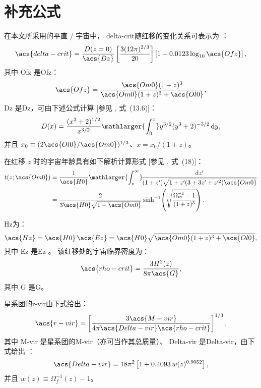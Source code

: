 
\chapter{补充公式}
\label{chap:formulas}


在本文所采用的平直 \lcdm/ 宇宙中，
\ac{delta-crit}随红移的变化关系可表示为 \cite{kitayama1996,randall2002}：
\begin{equation}
  \label{eq:delta-crit}
  \acs{delta-crit} = \frac{D(z=0)}{\acs{Dz}}
    \left[ \frac{3 (12\pi)^{2/3}}{20} \right]
    \left[1 + 0.0123 \log_{10} \acs{Ofz} \right] ,
\end{equation}
其中 \acs{Ofz} 是\acl{Ofz}：
\begin{equation}
  \label{eq:omega-fz}
  \acs{Ofz} = \frac{\acs{Om0} (1+z)^3}{\acs{Om0} (1+z)^3 + \acs{Ol0}} ,
\end{equation}
\acs{Dz} 是\acl{Dz}，可由下述公式计算
[参见 \textcite{peebles1980}, 式~(13.6)]：
\begin{equation}
  \label{eq:growth-factor}
  D(x) = \frac{(x^3 + 2)^{1/2}}{x^{3/2}}
    \mathlarger{\int_0^x} y^{3/2} (y^3 + 2)^{-3/2} \,\D{y} ,
\end{equation}
并且 $x_0 \equiv (2 \acs{Ol0}/\acs{Om0})^{1/3}$、$x = x_0 / (1+z)$。

在红移 $z$ 时的宇宙年龄具有如下解析计算形式
[参见 \textcite{thomas2000}, 式~(18)]：
\begin{align}
  \label{eq:universe-age}
  t(z; \acs{Om0})
    & = \frac{1}{\acs{H0}} \mathlarger{\int_z^{\infty}}
      \!\frac{\D{z'}}{(1+z')\sqrt{1 + z' (3+3z'+z'^2) \acs{Om0}}}
      \nonumber \\
    & = \frac{2}{3 \acs{H0} \sqrt{1-\acs{Om0}}} \sinh^{-1}
      \!\left( \sqrt{\frac{\Omega_m^{-1} - 1}{(1+z)^3}} \right).
\end{align}

\acl{Hz}为：
\begin{equation}
  \label{eq:hubble-z}
  \acs{Hz} = \acs{H0} \, \acs{Ez}
    = \acs{H0} \sqrt{\acs{Om0} (1+z)^3 + \acs{Ol0}} ,
\end{equation}
其中 \acs{Ez} 是\acl{Ez} \cite{hogg1999}。
该红移处的宇宙临界密度为：
\begin{equation}
  \label{eq:rho-crit}
  \acs{rho-crit} = \frac{3 H^2(z)}{8 \pi \acs{G}} ,
\end{equation}
其中 \acs{G} 是\acl{G}。

星系团的\acf{r-vir}由下式给出：
\begin{equation}
  \label{eq:radius-virial}
  \acs{r-vir} = \left[
    \frac{3 \acs{M-vir}}{4\pi \acs{Delta-vir} \acs{rho-crit}}
  \right]^{1/3},
\end{equation}
其中 \acs{M-vir} 是星系团的\acl{M-vir}（亦可当作其总质量）、
\acs{Delta-vir} 是\acl{Delta-vir}，由下式给出
\cite{kitayama1996,cassano2005}：
\begin{equation}
  \label{eq:delta-vir}
  \acs{Delta-vir} = 18\pi^2 \left[ 1 + 0.4093 \, w(z)^{0.9052} \right],
\end{equation}
并且 $w(z) \equiv \Omega_f^{-1}(z) - 1$。

